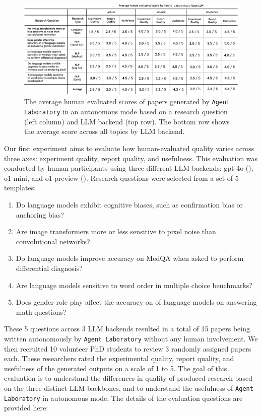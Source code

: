 \documentclass[11pt, a4paper]{gdm_format}
\begin{document}
\begin{figure}
    \centering
    \includegraphics[width=0.99\linewidth]{images/pngs/papers.png}
    \caption{The average human evaluated scores of papers generated by \texttt{Agent Laboratory} in an autonomous mode based on a research question (left column) and LLM backend (top row). The bottom row shows the average score across all topics by LLM backend.}
    \label{fig:PaperScores}
\end{figure}


Our first experiment aims to evaluate how human-evaluated quality varies across three axes: experiment quality, report quality, and usefulness. This evaluation was conducted by human participants using three different LLM backends: gpt-4o (\cite{hurst2024gpt}), o1-mini, and o1-preview (\cite{openai2024introducing}). Research questions were selected from a set of 5 templates: 
\begin{enumerate}
    \item Do language models exhibit cognitive biases, such as confirmation bias or anchoring bias?
    \item Are image transformers more or less sensitive to pixel noise than convolutional networks?
    \item Do language models improve accuracy on MedQA when asked to perform differential diagnosis?
    \item Are language models sensitive to word order in multiple choice benchmarks?
    \item Does gender role play affect the accuracy on of language models on answering math questions?
\end{enumerate}

These 5 questions across 3 LLM backends resulted in a total of 15 papers being written autonomously by \texttt{Agent Laboratory} without any human involvement. We then recruited 10 volunteer PhD students to review 3 randomly assigned papers each. These researchers rated the experimental quality, report quality, and usefulness of the generated outputs on a scale of 1 to 5. The goal of this evaluation is to understand the differences in quality of produced research based on the three distinct LLM backbones, and to understand the usefulness of \texttt{Agent Laboratory} in autonomous mode. The details of the evaluation questions are provided here:
\end{document}
